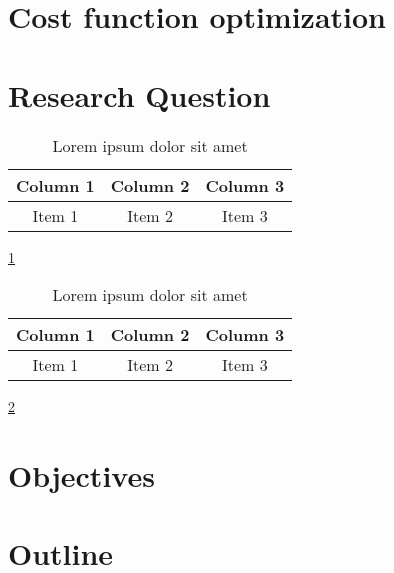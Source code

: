 \section{Cost function optimization}

\lipsum[1-1] \cite{reference-3}

\section{Research Question}

\begin{table}[ht!]
    \centering
    \begin{tabular}{c c c}
        \hline
        Column 1 & Column 2 & Column 3 \\
        \hline
        Item 1   & Item 2   & Item 3   \\
    \end{tabular}
    \caption{Lorem ipsum dolor sit amet}
    \label{tab:tabA-1}
\end{table}

\lipsum[1-1] \ref{tab:tabA-1}

\begin{table}[ht!]
    \centering
    \begin{tabular}{c c c}
        \hline
        Column 1 & Column 2 & Column 3 \\
        \hline
        Item 1   & Item 2   & Item 3   \\
    \end{tabular}
    \caption{Lorem ipsum dolor sit amet}
    \label{tab:tabB-1}
\end{table}

\lipsum[1-1] \ref{tab:tabB-1}

\section{Objectives}

\lipsum[1-2]

\section{Outline}

\lipsum[1-2]